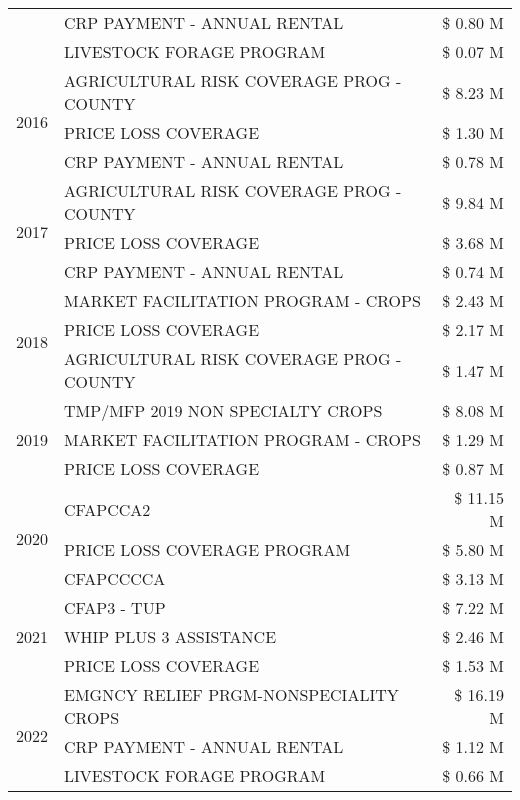 \begin{tabular}{llr}
 & CRP PAYMENT - ANNUAL RENTAL & \$ 0.80 M \\
 & LIVESTOCK FORAGE PROGRAM & \$ 0.07 M \\
\cline{1-3}
\multirow[t]{3}{*}{2016} & AGRICULTURAL RISK COVERAGE PROG - COUNTY & \$ 8.23 M \\
 & PRICE LOSS COVERAGE & \$ 1.30 M \\
 & CRP PAYMENT - ANNUAL RENTAL & \$ 0.78 M \\
\cline{1-3}
\multirow[t]{3}{*}{2017} & AGRICULTURAL RISK COVERAGE PROG - COUNTY & \$ 9.84 M \\
 & PRICE LOSS COVERAGE & \$ 3.68 M \\
 & CRP PAYMENT - ANNUAL RENTAL & \$ 0.74 M \\
\cline{1-3}
\multirow[t]{3}{*}{2018} & MARKET FACILITATION PROGRAM - CROPS & \$ 2.43 M \\
 & PRICE LOSS COVERAGE & \$ 2.17 M \\
 & AGRICULTURAL RISK COVERAGE PROG - COUNTY & \$ 1.47 M \\
\cline{1-3}
\multirow[t]{3}{*}{2019} & TMP/MFP 2019 NON SPECIALTY CROPS & \$ 8.08 M \\
 & MARKET FACILITATION PROGRAM - CROPS & \$ 1.29 M \\
 & PRICE LOSS COVERAGE & \$ 0.87 M \\
\cline{1-3}
\multirow[t]{3}{*}{2020} & CFAPCCA2 & \$ 11.15 M \\
 & PRICE LOSS COVERAGE PROGRAM & \$ 5.80 M \\
 & CFAPCCCCA & \$ 3.13 M \\
\cline{1-3}
\multirow[t]{3}{*}{2021} & CFAP3 - TUP & \$ 7.22 M \\
 & WHIP PLUS 3 ASSISTANCE & \$ 2.46 M \\
 & PRICE LOSS COVERAGE & \$ 1.53 M \\
\cline{1-3}
\multirow[t]{3}{*}{2022} & EMGNCY RELIEF PRGM-NONSPECIALITY CROPS & \$ 16.19 M \\
 & CRP PAYMENT - ANNUAL RENTAL & \$ 1.12 M \\
 & LIVESTOCK FORAGE PROGRAM & \$ 0.66 M \\
\cline{1-3}
\bottomrule
\end{tabular}
